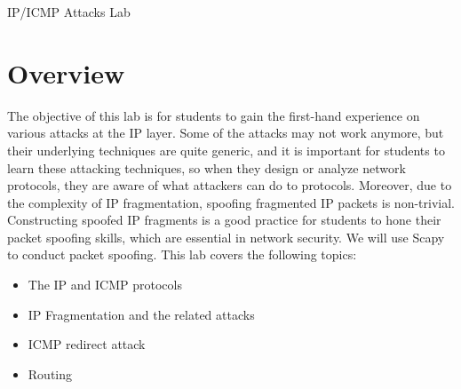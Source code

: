 
\newcommand{\commonfolder}{../../common-files}




\newcommand{\ipFigs}{./Figs}






\begin{center}
{\LARGE IP/ICMP Attacks Lab}
\end{center}



\section{Overview}

The objective of this lab is for students to gain the first-hand experience 
on various attacks at the IP layer. Some of the attacks may not work anymore,
but their underlying techniques are quite generic, and it
is important for students to learn these attacking techniques, so when they design
or analyze network protocols, they are aware of what attackers can do to protocols.
Moreover, due to the complexity of IP fragmentation, spoofing fragmented IP packets
is non-trivial.  Constructing spoofed 
IP fragments is a good practice for students to hone their
packet spoofing skills, which are essential in network security.  
We will use Scapy to conduct packet spoofing.  
This lab covers the following topics:

\begin{itemize}[noitemsep]
\item The IP and ICMP protocols
\item IP Fragmentation and the related attacks
\item ICMP redirect attack
\item Routing 
\end{itemize}



